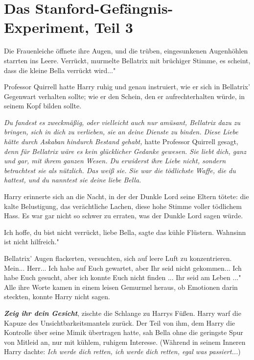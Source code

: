 \chapter{Das Stanford-Gefängnis-Experiment, Teil 3}

Die Frauenleiche öffnete ihre Augen, und die trüben, eingesunkenen Augenhöhlen
starrten ins Leere. \glqq Verrückt\grqq{}, murmelte Bellatrix mit brüchiger
Stimme, \glqq es scheint, dass die kleine Bella verrückt wird..."

Professor Quirrell hatte Harry ruhig und genau instruiert, wie er sich in
Bellatrix' Gegenwart verhalten sollte; wie er den Schein, den er
aufrechterhalten würde, in seinem Kopf bilden sollte.

\emph{Du fandest es zweckmäßig, oder vielleicht auch nur amüsant, Bellatrix dazu
zu bringen, sich in dich zu verlieben, sie an deine Dienste zu binden. Diese
Liebe hätte durch Askaban hindurch Bestand gehabt,} hatte Professor Quirrell
gesagt, \emph{denn für Bellatrix wäre es kein glücklicher Gedanke gewesen. Sie
liebt dich, ganz und gar, mit ihrem ganzen Wesen. Du erwiderst ihre Liebe nicht,
sondern betrachtest sie als nützlich. Das weiß sie. Sie war die tödlichste
Waffe, die du hattest, und du nanntest sie deine liebe Bella.}

Harry erinnerte sich an die Nacht, in der der Dunkle Lord seine Eltern tötete:
die kalte Belustigung, das verächtliche Lachen, diese hohe Stimme voller
tödlichem Hass. Es war gar nicht so schwer zu erraten, was der Dunkle Lord sagen
würde.

\glqq Ich hoffe, du bist nicht verrückt, liebe Bella\grqq{}, sagte das kühle
Flüstern. \glqq Wahnsinn ist nicht hilfreich."

Bellatrix' Augen flackerten, versuchten, sich auf leere Luft zu konzentrieren.
\glqq Mein... Herr... Ich habe auf Euch gewartet, aber Ihr seid nicht
gekommen... Ich habe Euch gesucht, aber ich konnte Euch nicht finden ... Ihr
seid am Leben ..." Alle ihre Worte kamen in einem leisen Gemurmel heraus, ob
Emotionen darin steckten, konnte Harry nicht sagen.

\glqq \textbf{\emph{Zeig ihr dein Gesicht}}\grqq{}, zischte die Schlange zu
Harrys Füßen. Harry warf die Kapuze des Unsichtbarkeitsmantels zurück. Der Teil
von ihm, dem Harry die Kontrolle über seine Mimik übertragen hatte, sah Bella
ohne die geringste Spur von Mitleid an, nur mit kühlem, ruhigem Interesse.
(Während in seinem Inneren Harry dachte:\emph{ Ich werde dich retten, ich werde
dich retten, egal was passiert...})


